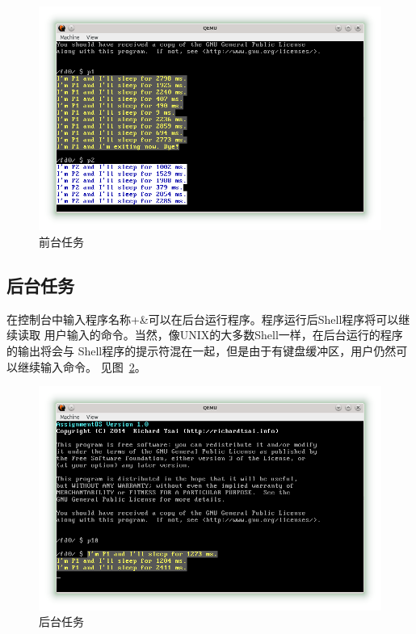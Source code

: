 \documentclass[a4paper, adobefonts]{ctexart}
\begin{document}
\begin{figure}[htp!]
    \center
    \includegraphics[scale=0.72]{0.png}
    \caption{前台任务}\label{fig:fg}
\end{figure}

\subsection{后台任务}
在控制台中输入程序名称+\&可以在后台运行程序。程序运行后Shell程序将可以继续读取
用户输入的命令。当然，像UNIX的大多数Shell一样，在后台运行的程序的输出将会与
Shell程序的提示符混在一起，但是由于有键盘缓冲区，用户仍然可以继续输入命令。
见图~\ref{fig:bg}。

\begin{figure}[htp!]
    \center
    \includegraphics[scale=0.72]{1.png}
    \caption{后台任务}\label{fig:bg}
\end{figure}
\end{document}
